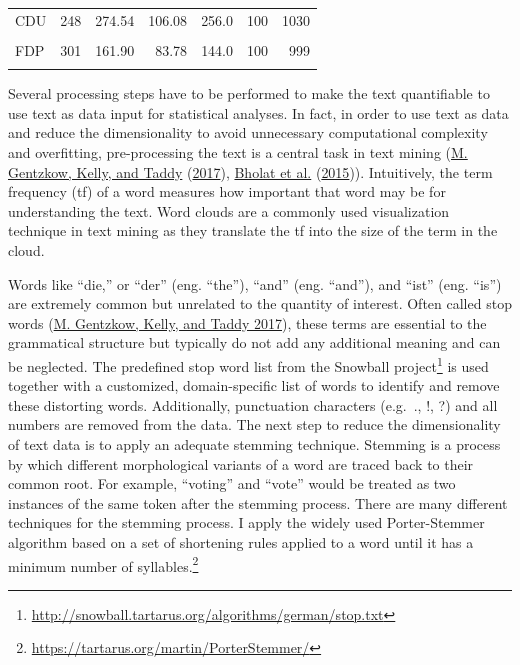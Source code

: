 \documentclass[
  12pt,
]{article}
\begin{document}
\begin{table}[H]
\begin{tabular}[t]{lrrrrrr}
\hspace{1em}CDU & 248 & 274.54 & 106.08 & 256.0 & 100 & 1030\\
\hspace{1em}\cellcolor{gray!6}{DIE LINKE} & \cellcolor{gray!6}{686} & \cellcolor{gray!6}{200.47} & \cellcolor{gray!6}{71.78} & \cellcolor{gray!6}{190.0} & \cellcolor{gray!6}{101} & \cellcolor{gray!6}{1048}\\
\hspace{1em}FDP & 301 & 161.90 & 83.78 & 144.0 & 100 & 999\\
\hspace{1em}\cellcolor{gray!6}{SPD} & \cellcolor{gray!6}{315} & \cellcolor{gray!6}{213.41} & \cellcolor{gray!6}{56.16} & \cellcolor{gray!6}{208.0} & \cellcolor{gray!6}{103} & \cellcolor{gray!6}{429}\\
\bottomrule
\end{tabular}
\end{table}

Several processing steps have to be performed to make the text
quantifiable to use text as data input for statistical analyses. In
fact, in order to use text as data and reduce the dimensionality to
avoid unnecessary computational complexity and overfitting,
pre-processing the text is a central task in text mining
(\protect\hyperlink{ref-gentzkow_text_2017}{M. Gentzkow, Kelly, and
Taddy} (\protect\hyperlink{ref-gentzkow_text_2017}{2017}),
\protect\hyperlink{ref-bholat_text_2015}{Bholat et al.}
(\protect\hyperlink{ref-bholat_text_2015}{2015})). Intuitively, the term
frequency (tf) of a word measures how important that word may be for
understanding the text. Word clouds are a commonly used visualization
technique in text mining as they translate the tf into the size of the
term in the cloud.

Words like ``die,'' or ``der'' (eng. ``the''), ``and'' (eng. ``and''),
and ``ist'' (eng. ``is'') are extremely common but unrelated to the
quantity of interest. Often called stop words
(\protect\hyperlink{ref-gentzkow_text_2017}{M. Gentzkow, Kelly, and
Taddy 2017}), these terms are essential to the grammatical structure but
typically do not add any additional meaning and can be neglected. The
predefined stop word list from the Snowball project\footnote{\url{http://snowball.tartarus.org/algorithms/german/stop.txt}}
is used together with a customized, domain-specific list of words to
identify and remove these distorting words. Additionally, punctuation
characters (e.g.~., !, ?) and all numbers are removed from the data. The
next step to reduce the dimensionality of text data is to apply an
adequate stemming technique. Stemming is a process by which different
morphological variants of a word are traced back to their common root.
For example, ``voting'' and ``vote'' would be treated as two instances
of the same token after the stemming process. There are many different
techniques for the stemming process. I apply the widely used
Porter-Stemmer algorithm based on a set of shortening rules applied to a
word until it has a minimum number of syllables.\footnote{\url{https://tartarus.org/martin/PorterStemmer/}}
\end{document}
